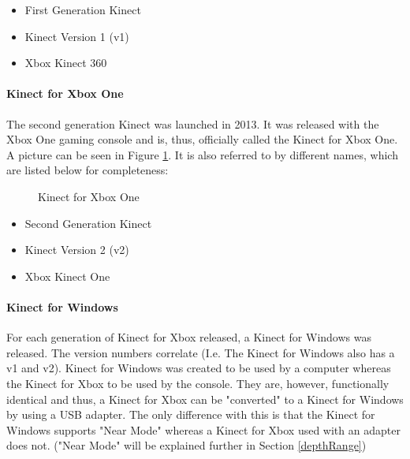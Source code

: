 \begin{itemize}
	\item First Generation Kinect 
	\item Kinect Version 1 (v1)
	\item Xbox Kinect 360 
\end{itemize} 

\paragraph{Kinect for Xbox One}
The second generation Kinect was launched in 2013. It was released with the Xbox One gaming console and is, thus, officially called the Kinect for Xbox One. \cite{kinectComp2011} A picture can be seen in Figure \ref{fig:kinectOne}. It is also referred to by different names, which are listed below for completeness:

\begin{figure}[ht]
	\centering
	{%
		\setlength{\fboxsep}{0pt}%
		\setlength{\fboxrule}{0.5pt}%
		}
	\caption{Kinect for Xbox One \cite{kinectComp2011}}
	\label{fig:kinectOne}
\end{figure}

\begin{itemize}
	\item Second Generation Kinect 
	\item Kinect Version 2 (v2)
	\item Xbox Kinect One 
\end{itemize} 

\paragraph{Kinect for Windows}
For each generation of Kinect for Xbox released, a Kinect for Windows was released. The version numbers correlate (I.e. The Kinect for Windows also has a v1 and v2). Kinect for Windows was created to be used by a computer whereas the Kinect for Xbox to be used by the console. They are, however, functionally identical and thus, a Kinect for Xbox can be "converted" to a  Kinect for Windows by using a USB adapter. The only difference with this is that the Kinect for Windows supports "Near Mode" whereas a Kinect for Xbox used with an adapter does not. ("Near Mode" will be explained further in Section \ref{depthRange})

